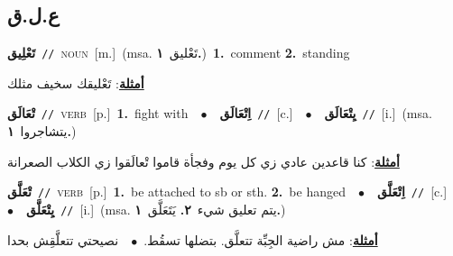 \documentclass[10pt,a4paper,twoside]{article} %
\begin{document}
\begin{multicols}{2}
\vspace{-3mm}
\subsection*{\color{blue}\foreignlanguage{arabic}{ع.ل.ق}\color{blue}{}} 

{\setlength\topsep{0pt}\textbf{\foreignlanguage{arabic}{تَعْلِيق}}\ {\color{gray}\texttt{//}\color{black}}\ \textsc{noun}\ [m.]\ \color{gray}(msa. \foreignlanguage{arabic}{تَعْليق}~\foreignlanguage{arabic}{\textbf{١.}})\color{black}\ \textbf{1.}~comment  \textbf{2.}~standing\  \begin{flushright}\color{gray}\foreignlanguage{arabic}{\textbf{\underline{\foreignlanguage{arabic}{أمثلة}}}: تَعْليقك سخيف مثلك}\end{flushright}\color{black}} \vspace{2mm}

{\setlength\topsep{0pt}\textbf{\foreignlanguage{arabic}{تْعَالَق}}\ {\color{gray}\texttt{//}\color{black}}\ \textsc{verb}\ [p.]\ \textbf{1.}~fight with\ \ $\bullet$\ \ \setlength\topsep{0pt}\textbf{\foreignlanguage{arabic}{اِتْعَالَق}}\ {\color{gray}\texttt{//}\color{black}}\ [c.]\ \ $\bullet$\ \ \setlength\topsep{0pt}\textbf{\foreignlanguage{arabic}{يِتْعَالَق}}\ {\color{gray}\texttt{//}\color{black}}\ [i.]\ \color{gray}(msa. \foreignlanguage{arabic}{يتشاجروا}~\foreignlanguage{arabic}{\textbf{١.}})\color{black}\  \begin{flushright}\color{gray}\foreignlanguage{arabic}{\textbf{\underline{\foreignlanguage{arabic}{أمثلة}}}: كنا قاعدين عادي زي كل يوم وفجأة قاموا تْعالَقوا زي الكلاب الصعرانة}\end{flushright}\color{black}} \vspace{2mm}

{\setlength\topsep{0pt}\textbf{\foreignlanguage{arabic}{تْعَلَّق}}\ {\color{gray}\texttt{//}\color{black}}\ \textsc{verb}\ [p.]\ \textbf{1.}~be attached to sb or sth.  \textbf{2.}~be hanged\ \ $\bullet$\ \ \setlength\topsep{0pt}\textbf{\foreignlanguage{arabic}{اِتْعَلَّق}}\ {\color{gray}\texttt{//}\color{black}}\ [c.]\ \ $\bullet$\ \ \setlength\topsep{0pt}\textbf{\foreignlanguage{arabic}{يِتْعَلَّق}}\ {\color{gray}\texttt{//}\color{black}}\ [i.]\ \color{gray}(msa. \foreignlanguage{arabic}{يتم تعليق شيء}~\foreignlanguage{arabic}{\textbf{٢.}}  \foreignlanguage{arabic}{يَتَعَلَّق}~\foreignlanguage{arabic}{\textbf{١.}})\color{black}\  \begin{flushright}\color{gray}\foreignlanguage{arabic}{\textbf{\underline{\foreignlanguage{arabic}{أمثلة}}}: مش راضية الجِبِّة تتعلَّق. بتضلها تسقُط.\ $\bullet$\ \  نصيحتي تتعلَّقِش بحدا}\end{flushright}\color{black}} \vspace{2mm}


\end{multicols}
\end{document}

